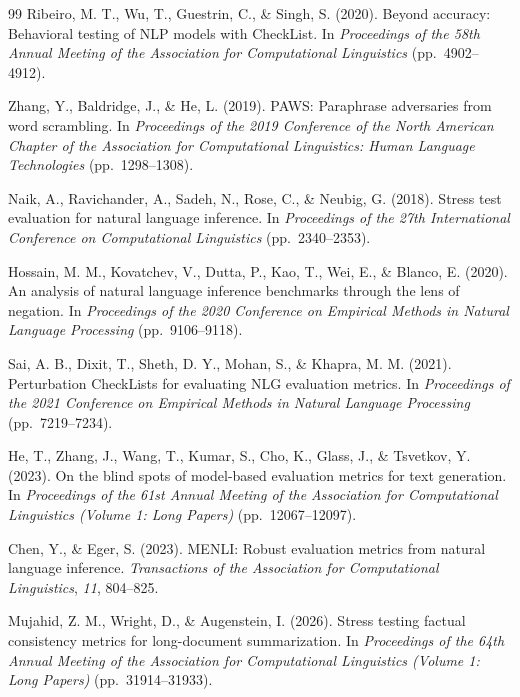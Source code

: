 \begin{thebibliography}{99}
Ribeiro, M. T., Wu, T., Guestrin, C., \& Singh, S. (2020). Beyond accuracy:
Behavioral testing of NLP models with CheckList. In \textit{Proceedings of the
58th Annual Meeting of the Association for Computational Linguistics}
(pp.~4902--4912).

Zhang, Y., Baldridge, J., \& He, L. (2019). PAWS: Paraphrase adversaries from
word scrambling. In \textit{Proceedings of the 2019 Conference of the North
American Chapter of the Association for Computational Linguistics: Human
Language Technologies} (pp.~1298--1308).

Naik, A., Ravichander, A., Sadeh, N., Rose, C., \& Neubig, G. (2018). Stress test
evaluation for natural language inference. In \textit{Proceedings of the 27th
International Conference on Computational Linguistics} (pp.~2340--2353).

Hossain, M. M., Kovatchev, V., Dutta, P., Kao, T., Wei, E., \& Blanco, E.
(2020). An analysis of natural language inference benchmarks through the lens
of negation. In \textit{Proceedings of the 2020 Conference on Empirical Methods
in Natural Language Processing} (pp.~9106--9118).

Sai, A. B., Dixit, T., Sheth, D. Y., Mohan, S., \& Khapra, M. M. (2021).
Perturbation CheckLists for evaluating NLG evaluation metrics. In
\textit{Proceedings of the 2021 Conference on Empirical Methods in Natural
Language Processing} (pp.~7219--7234).

He, T., Zhang, J., Wang, T., Kumar, S., Cho, K., Glass, J., \& Tsvetkov, Y.
(2023). On the blind spots of model-based evaluation metrics for text
generation. In \textit{Proceedings of the 61st Annual Meeting of the
Association for Computational Linguistics (Volume 1: Long Papers)}
(pp.~12067--12097).

Chen, Y., \& Eger, S. (2023). MENLI: Robust evaluation metrics from natural
language inference. \textit{Transactions of the Association for Computational
Linguistics}, \textit{11}, 804--825.

Mujahid, Z. M., Wright, D., \& Augenstein, I. (2026). Stress testing factual
consistency metrics for long-document summarization. In \textit{Proceedings of
the 64th Annual Meeting of the Association for Computational Linguistics (Volume
1: Long Papers)} (pp.~31914--31933).


\end{thebibliography}

